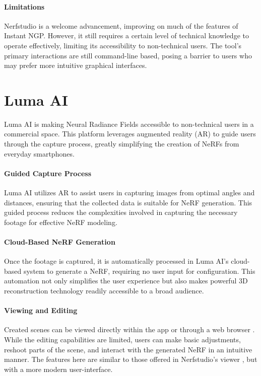 \paragraph{Limitations}
Nerfstudio is a welcome advancement, improving on much of the features of Instant NGP. 
However, it still requires a certain level of technical knowledge to operate effectively, limiting its accessibility to non-technical users.
The tool's primary interactions are still command-line based, posing a barrier to users who may prefer more intuitive graphical interfaces.

\section{Luma AI}
\label{sec:related:luma}

Luma AI \cite{noauthor_luma_nodate} is making Neural Radiance Fields accessible to non-technical users in a commercial space.
This platform leverages augmented reality (AR) to guide users through the capture process, greatly simplifying the creation of NeRFs from everyday smartphones.

\paragraph{Guided Capture Process}
Luma AI utilizes AR to assist users in capturing images from optimal angles and distances, ensuring that the collected data is suitable for NeRF generation.
This guided process reduces the complexities involved in capturing the necessary footage for effective NeRF modeling.

\paragraph{Cloud-Based NeRF Generation}
Once the footage is captured, it is automatically processed in Luma AI’s cloud-based system to generate a NeRF, requiring no user input for configuration.
This automation not only simplifies the user experience but also makes powerful 3D reconstruction technology readily accessible to a broad audience.

\paragraph{Viewing and Editing}
Created scenes can be viewed directly within the app or through a web browser . 
While the editing capabilities are limited, users can make basic adjustments, reshoot parts of the scene, and interact with the generated NeRF in an intuitive manner.
The features here are similar to those offered in Nerfstudio's viewer , but with a more modern user-interface.

